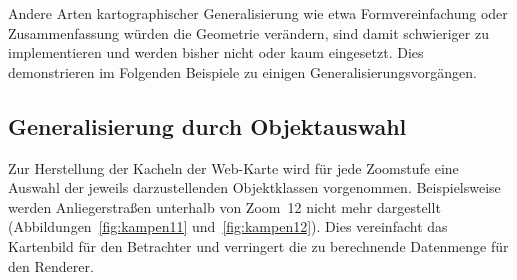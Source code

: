 \documentclass[../main/thesis.tex]{subfiles}
\begin{document}
Andere Arten kartographischer Generalisierung wie etwa Formvereinfachung oder Zusammenfassung würden die Geometrie verändern, sind damit schwieriger zu implementieren und werden bisher nicht oder kaum eingesetzt.
Dies demonstrieren im Folgenden Beispiele zu einigen Generalisierungsvorgängen.



\subsection{Generalisierung durch Objektauswahl}

Zur Herstellung der Kacheln der Web-Karte wird für jede Zoomstufe eine Auswahl der jeweils darzustellenden Objektklassen vorgenommen.
Beispielsweise werden Anliegerstraßen  unterhalb von Zoom~12 nicht mehr dargestellt (Abbildungen~\ref{fig:kampen11} und~\ref{fig:kampen12}).
Dies vereinfacht das Kartenbild für den Betrachter und verringert die zu berechnende Datenmenge für den Renderer.


\end{document}
